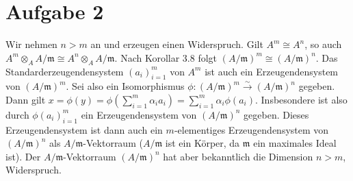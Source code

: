 \documentclass{article}
\begin{document}
\section*{Aufgabe 2}
Wir nehmen $n > m$ an und erzeugen einen Widerspruch.
Gilt $A^m \cong A^n$, so auch $A^m \otimes_A A/\mathfrak{m} \cong A^n \otimes_A A/\mathfrak{m}$.
Nach Korollar 3.8 folgt $(A/\mathfrak{m})^m \cong (A/\mathfrak{m})^n$.
Das Standarderzeugendensystem $(a_i)_{i = 1}^m$ von $A^m$ ist auch ein Erzeugendensystem von $(A/\mathfrak{m})^m$.
Sei also ein Isomorphismus $\phi \colon (A/\mathfrak{m})^m \xrightarrow{\sim} (A/\mathfrak{m})^n$ gegeben.
Dann gilt $x = \phi(y) = \phi(\sum_{i = 1}^{m} \alpha_i a_i) = \sum_{i = 1}^{m} \alpha_i \phi(a_i)$. 
Insbesondere ist also durch $\phi(a_i)_{i = 1}^m$ ein Erzeugendensystem von $(A/\mathfrak{m})^n$ gegeben.
Dieses Erzeugendensystem ist dann auch ein $m$-elementiges Erzeugendensystem von $(A/\mathfrak{m})^n$ als $A/\mathfrak{m}$-Vektorraum
($A/\mathfrak{m}$ ist ein Körper, da $\mathfrak{m}$ ein maximales Ideal ist).
Der $A/\mathfrak{m}$-Vektorraum $(A/\mathfrak{m})^n$ hat aber bekanntlich die Dimension $n > m$, Widerspruch.
\end{document}
